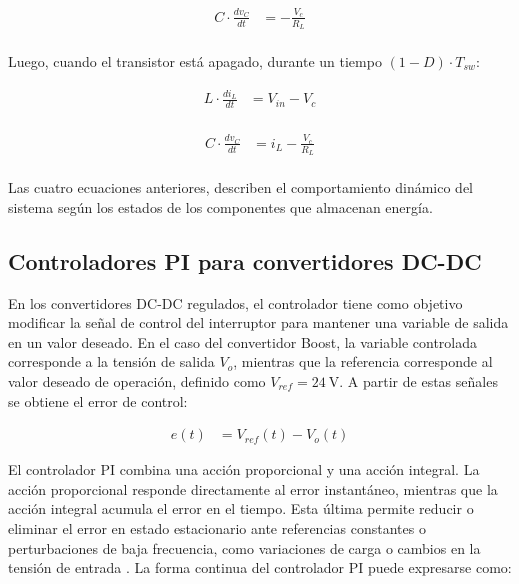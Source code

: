 \documentclass[conference]{IEEEtran}
\begin{document}
\begin{equation}
\begin{aligned}
    C \cdot \frac{dv_C}{dt} &= -\frac{V_c}{R_L}  \\
\end{aligned}
\label{eq:capacitor_current1}
\end{equation}

Luego, cuando el transistor está apagado, durante un tiempo $(1 - D) \cdot T_{sw}$:

\begin{equation}
\begin{aligned}
    L \cdot \frac{di_L}{dt} &= V_{in} - V_c  \\
\end{aligned}
\label{eq:inductor_voltage_off}
\end{equation}

\begin{equation}
\begin{aligned}
    C \cdot \frac{dv_C}{dt} &= i_L - \frac{V_c}{R_L}  \\
\end{aligned}
\label{eq:capacitor_current_off}
\end{equation}

Las cuatro ecuaciones anteriores, describen el comportamiento dinámico del sistema según los estados de los componentes
que almacenan energía. 




\subsection{Controladores PI para convertidores DC-DC}

En los convertidores DC-DC regulados, el controlador tiene como objetivo modificar la señal de control del interruptor para mantener una variable de salida en un valor deseado. En el caso del convertidor Boost, la variable controlada corresponde a la tensión de salida $V_o$, mientras que la referencia corresponde al valor deseado de operación, definido como $V_{ref}=24~\mathrm{V}$. A partir de estas señales se obtiene el error de control:

\begin{equation}
\begin{aligned}
    e(t) &= V_{ref}(t) - V_o(t)
\end{aligned}
\label{eq:error_control_pi}
\end{equation}

El controlador PI combina una acción proporcional y una acción integral. La acción proporcional responde directamente al error instantáneo, mientras que la acción integral acumula el error en el tiempo. Esta última permite reducir o eliminar el error en estado estacionario ante referencias constantes o perturbaciones de baja frecuencia, como variaciones de carga o cambios en la tensión de entrada \cite{nise2015control}. La forma continua del controlador PI puede expresarse como:
\end{document}
